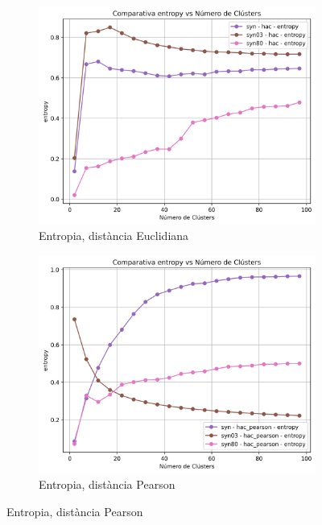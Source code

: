 \documentclass[a4paper,12pt]{report}
\begin{document}
\begin{figure}[H]
    \vspace{1em}

    \begin{subfigure}[b]{0.49\textwidth}
        \includegraphics[width=\textwidth]{Figuras/entropy-hac-sin.png}
        \caption{Entropia, distància Euclidiana}
        \label{fig:hac-clustering-sin-results-e}
    \end{subfigure}
    \hfill
    \begin{subfigure}[b]{0.49\textwidth}
        \includegraphics[width=\textwidth]{Figuras/entropy-hac_pearson-sin.png}
        \caption{Entropia, distància Pearson}
        \label{fig:hac-clustering-sin-results-f}
    \end{subfigure}


\end{figure}
\end{document}
